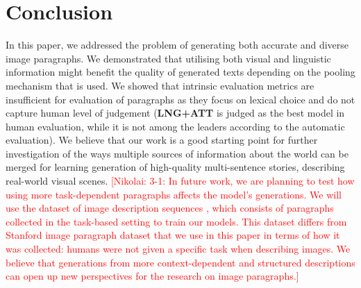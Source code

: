 \documentclass[11pt,a4paper]{article}
\newcommand{\kibitz}[2]{\ifnum\Comments=1\textcolor{#1}{#2}\fi}
\newcommand{\nikolai}[1]{\kibitz{red}  {[Nikolai: #1]}}
\begin{document}
\section{Conclusion}


In this paper, we addressed the problem of generating both accurate and diverse image paragraphs.
We demonstrated that utilising both visual and linguistic information might benefit the quality of generated texts depending on the pooling mechanism that is used.
We showed that intrinsic evaluation metrics are insufficient for evaluation of paragraphs as they focus on lexical choice and do not capture human level of judgement (\textbf{LNG+ATT} is judged as the best model in human evaluation, while it is not among the leaders according to the automatic evaluation).
We believe that our work is a good starting point for further investigation of the ways multiple sources of information about the world can be merged for learning generation of high-quality multi-sentence stories, describing real-world visual scenes.
\nikolai{3-1:
In future work, we are planning to test how using more task-dependent paragraphs affects the model's generations.
We will use the dataset of image description sequences \cite{ilinykh19}, which consists of paragraphs collected in the task-based setting to train our models.
This dataset differs from Stanford image paragraph dataset that we use in this paper in terms of how it was collected: humans were not given a specific task when describing images.
We believe that generations from more context-dependent and structured descriptions can open up new perspectives for the research on image paragraphs.}



\end{document}
